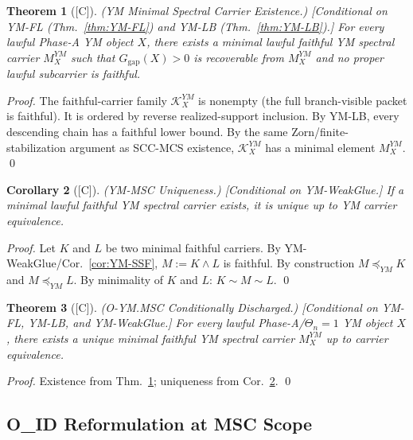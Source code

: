 \documentclass[12pt,oneside]{amsbook}
\theoremstyle{plain}
\newtheorem{theorem}{Theorem}[section]
\newtheorem{corollary}[theorem]{Corollary}
\theoremstyle{definition}
\theoremstyle{remark}
\newcommand{\status}[1]{\textup{[#1]}}
\begin{document}
\begin{theorem}[\status{C}]\label{thm:YM-MSC-existence}
\textup{(YM Minimal Spectral Carrier Existence.)}
\textup{[Conditional on YM-FL (Thm.~\ref{thm:YM-FL}) and
YM-LB (Thm.~\ref{thm:YM-LB}).]}
For every lawful Phase-A YM object $X$, there exists a minimal
lawful faithful YM spectral carrier $M_X^{YM}$ such that
$G_{\mathrm{gap}}(X) > 0$ is recoverable from $M_X^{YM}$ and no
proper lawful subcarrier is faithful.
\end{theorem}

\begin{proof}
The faithful-carrier family $\mathcal{K}_X^{YM}$ is nonempty (the
full branch-visible packet is faithful). It is ordered by reverse
realized-support inclusion. By YM-LB, every descending chain has a
faithful lower bound. By the same Zorn/finite-stabilization argument
as SCC-MCS existence, $\mathcal{K}_X^{YM}$ has a minimal element
$M_X^{YM}$.
\qed
\end{proof}

\begin{corollary}[\status{C}]\label{cor:YM-MSC-uniqueness}
\textup{(YM-MSC Uniqueness.)}
\textup{[Conditional on YM-WeakGlue.]}
If a minimal lawful faithful YM spectral carrier exists, it is unique
up to YM carrier equivalence.
\end{corollary}

\begin{proof}
Let $K$ and $L$ be two minimal faithful carriers. By
YM-WeakGlue/Cor.~\ref{cor:YM-SSF}, $M := K \wedge L$ is faithful.
By construction $M \preceq_{YM} K$ and $M \preceq_{YM} L$. By
minimality of $K$ and $L$: $K \sim M \sim L$.
\qed
\end{proof}

\begin{theorem}[\status{C}]\label{thm:YM-MSC}
\textup{(O-YM.MSC Conditionally Discharged.)}
\textup{[Conditional on YM-FL, YM-LB, and YM-WeakGlue.]}
For every lawful Phase-A/$\Theta_n=1$ YM object $X$, there exists a
unique minimal faithful YM spectral carrier $M_X^{YM}$ up to carrier
equivalence.
\end{theorem}

\begin{proof}
Existence from Thm.~\ref{thm:YM-MSC-existence}; uniqueness from
Cor.~\ref{cor:YM-MSC-uniqueness}.
\qed
\end{proof}

\subsection{O\_{ID} Reformulation at MSC Scope}
\end{document}
